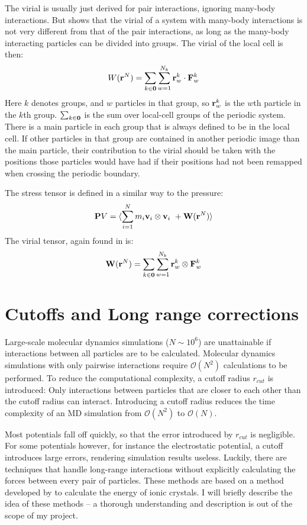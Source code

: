The virial is usually just derived for pair interactions, ignoring many-body interactions. But \citet{Thompson2009} shows that the virial of a system with many-body interactions is not very different from that of the pair interactions, as long as the many-body interacting particles can be divided into groups. The virial of the local cell is then:
\begin{equation}
	W(\mathbf{r}^N) = \sum_{k\in\mathbf{0}}\sum_{w=1}^{N_k} \mathbf{r}^k_w \cdot \mathbf{F}^k_w
\end{equation}
Here $k$ denotes groups, and $w$ particles in that group, so $\mathbf{r}^k_w$ is the $w$th particle in the $k$th group. $\sum_{k \in \mathbf{0}}$ is the sum over local-cell groups of the periodic system. There is a main particle in each group that is always defined to be in the local cell. If other particles in that group are contained in another periodic image than the main particle, their contribution to the virial should be taken with the positions those particles would have had if their positions had not been remapped when crossing the periodic boundary.

The stress tensor is defined in a similar way to the pressure:
\begin{equation}
	\mathbf{P} V = \langle \sum_{i=1}^N m_i \mathbf{v}_i \otimes \mathbf{v}_i \ + \mathbf{W}(\mathbf{r}^N)\rangle
\end{equation}
The virial tensor, again found in \citet{Thompson2009} is:
\begin{equation}
	\mathbf{W}(\mathbf{r}^N) = \sum_{k \in \mathbf{0}} \sum_{w=1}^{N_k} \mathbf{r}_w^k \otimes \mathbf{F}^k_w
\end{equation}

\section{Cutoffs and Long range corrections}
Large-scale molecular dynamics simulations ($N \sim 10^6$) are unattainable if interactions between all particles are to be calculated. Molecular dynamics simulations with only pairwise interactions require $\mathcal{O}(N^2)$ calculations to be performed. To reduce the computational complexity, a cutoff radius $r_{cut}$ is introduced: Only interactions between particles that are closer to each other than the cutoff radius can interact. Introducing a cutoff radius reduces the time complexity of an MD simulation from $\mathcal{O}(N^2)$ to $\mathcal{O}(N)$. 

Most potentials fall off quickly, so that the error introduced by $r_{cut}$ is negligible. For some potentials however, for instance the electrostatic potential, a cutoff introduces large errors, rendering simulation results useless. Luckily, there are techniques that handle long-range interactions without explicitly calculating the forces between every pair of particles. These methods are based on a method developed by \citet{ANDP:ANDP19213690304} to calculate the energy of ionic crystals. I will briefly describe the idea of these methods -- a thorough understanding and description is out of the scope of my project.

